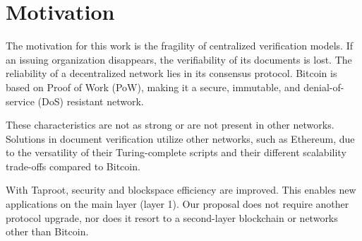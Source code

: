 \section{Motivation}

The motivation for this work is the fragility of centralized verification models.
If an issuing organization disappears, the verifiability of its documents is lost.
The reliability of a decentralized network lies in its consensus protocol.
Bitcoin is based on Proof of Work (PoW), making it a secure, immutable, and denial-of-service (DoS) resistant network.

These characteristics are not as strong or are not present in other networks.
Solutions in document verification utilize other networks, such as Ethereum, due to the versatility of their Turing-complete scripts and their different scalability trade-offs compared to Bitcoin.

With Taproot, security and blockspace efficiency are improved.
This enables new applications on the main layer (layer 1).
Our proposal does not require another protocol upgrade, nor does it resort to a second-layer blockchain or networks other than Bitcoin.